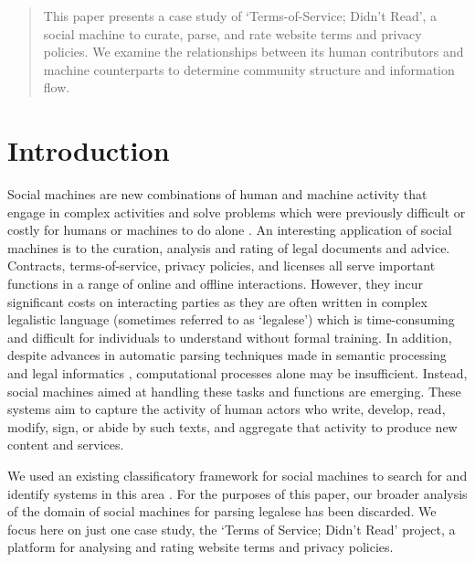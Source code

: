 \documentclass{sig-alternate}
\begin{document}
\maketitle
\begin{abstract}

This paper presents a case study of `Terms-of-Service; Didn't Read', a social machine to curate, parse, and rate website terms and privacy policies. We examine the relationships between its human contributors and machine counterparts to determine community structure and information flow.

\end{abstract}



\section{Introduction}

Social machines are new combinations of human and machine activity that engage in complex activities and solve problems which were previously difficult or costly for humans or machines to do alone \cite{shadbolt:classif}. An interesting application of social machines is to the curation, analysis and rating of legal documents and advice. Contracts, terms-of-service, privacy policies, and licenses all serve important functions in a range of online and offline interactions. However, they incur significant costs on interacting parties as they are often written in complex legalistic language (sometimes referred to as `legalese') which is time-consuming and difficult for individuals to understand without formal training. In addition, despite advances in automatic parsing techniques made in semantic processing and legal informatics \cite{franc:semantic, spinosa:nlp}, computational processes alone may be insufficient. Instead, social machines aimed at handling these tasks and functions are emerging. These systems aim to capture the activity of human actors who write, develop, read, modify, sign, or abide by such texts, and aggregate that activity to produce new content and services.

We used an existing classificatory framework for social machines to search for and identify systems in this area \cite{shadbolt:classif}. For the purposes of this paper, our broader analysis of the domain of social machines for parsing legalese has been discarded. We focus here on just one case study, the `Terms of Service; Didn't Read' project, a platform for analysing and rating website terms and privacy policies.
\end{document}
